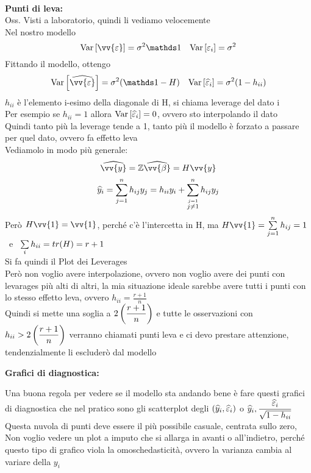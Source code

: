 \phantom{}\\

\textbf{Punti di leva:}\\
Oss. Visti a laboratorio, quindi li vediamo velocemente\\

Nel nostro modello
\[
\var{\vv{\eps}}=\sigma^2\II \ \ \ \var{\eps_i}=\sigma^2
\]
Fittando il modello, ottengo
\[
\var{\hat{\vv{\eps}}}=\sigma^2 (\II-H) \ \ \ \var{\hat{\eps}_i}=\sigma^2 (1-h_{ii})
\]
$h_{ii}$ è l'elemento i-esimo della diagonale di H, si chiama leverage del dato i\\
Per esempio se $h_{ii}=1$ allora $\text{Var} \left[ \widehat{\varepsilon}_i \right]=0$, ovvero sto interpolando il dato\\
Quindi tanto più la leverage tende a 1, tanto più il modello è forzato a passare per quel dato, ovvero fa effetto leva\\

Vediamolo in modo più generale:
\[
\hat{\vv{y}}=\ZZ\hat{\vv{\beta}}= H\vv{y}\]
\[
\widehat{y}_i = \sum\limits_{j=1}^{n} h_{ij}y_j = h_{ii} y_i + \sum\limits_{\overset{j=1}{j\ne1}}^{n} h_{ij}y_j
\]
Però $H\vv{1}=\vv{1}$, perché c'è l'intercetta in H, ma $H\vv{1} = \Sum{j=1}{n} h_{ij}=1$ \ e \ $\sum\limits_{i}^{} h_{ii}=tr(H)= r+1$\\


Si fa quindi il Plot dei Leverages\\
Però non voglio avere interpolazione, ovvero non voglio avere dei punti con levarages più alti di altri, la mia situazione ideale sarebbe avere tutti i punti con lo stesso effetto leva, ovvero $h_{ii}=\frac{r+1}{n}$\\

Quindi si mette una soglia a $2\left(\dfrac{r+1}{n}\right)$ e tutte le osservazioni con \ $h_{ii}>2\left(\dfrac{r+1}{n}\right)$ verranno chiamati punti leva e ci devo prestare attenzione, tendenzialmente li escluderò dal modello\\


\phantom{}


\textbf{Grafici di diagnostica:}

Una buona regola per vedere se il modello sta andando bene è fare questi grafici di diagnostica che nel pratico sono gli  scatterplot degli $(\widehat{y}_i,\widehat{\varepsilon}_i)$ o $\widehat{y}_i, \dfrac{\widehat{\varepsilon}_i}{\sqrt{1-h_{ii}}}$\\
Questa nuvola di punti deve essere il più possibile casuale, centrata sullo zero,
Non voglio vedere un plot a imputo che si allarga in avanti o all'indietro, perché questo tipo di grafico viola la omoschedasticità, ovvero la varianza cambia al variare della $y_i$
\phantom{}


